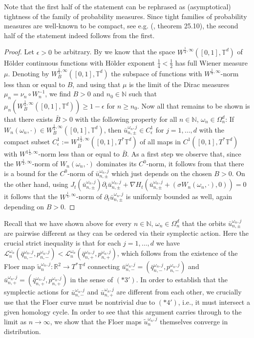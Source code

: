 \documentclass[a4paper,11pt]{amsart}
\newcommand{\NN}{\mathbb{N}}
\newcommand{\RR}{\mathbb{R}}
\newcommand{\TT}{\mathbb{T}}
\begin{document}
Note that the first half of the statement can be rephrased as (asymptotical) tightness of the family of probability measures. Since tight families of probability measures are well-known to be compact, see e.g. (\cite{Bi}, theorem 25.10), the second half of the statement indeed follows from the first.
\begin{proof}
Let $\epsilon>0$ be arbitrary. By  we know that the space $W^{\frac{1}{4},\infty}([0,1],\TT^d)$ of Hölder continuous functions with Hölder exponent $\frac{1}{4}<\frac{1}{2}$ has full Wiener measure $\mu$. Denoting by $W^{\frac{1}{4},\infty}_B([0,1],\TT^d)$ the subspace of functions with $W^{\frac{1}{4},\infty}$-norm less than or equal to $B$, and using that $\mu$ is the limit of the Dirac measures $\mu_n=\nu_n\circ W_n^{-1}$, we find $B>0$ and $n_0\in\NN$ such that $\mu_n(W^{\frac{1}{4},\infty}_B([0,1],\TT^d))\geq 1-\epsilon$ for $n\geq n_0$. Now all that remains to be shown is that there exists $\bar{B}>0$ with the following property for all $n\in\NN$, $\omega_n\in\Omega_n^d$: If $W_n(\omega_n,\cdot)\in W^{\frac{1}{4},\infty}_B([0,1],\TT^d)$, then $\bar{u}^{\omega_n,j}_{n,\pm}\in C^1_{\epsilon}$ for $j=1,\ldots,d$ with the compact subset $C^1_{\epsilon}:=W^{1\frac{1}{4},\infty}_{\bar{B}}([0,1],T^*\TT^d)$ of all maps in $C^1([0,1],T^*\TT^d)$ with $W^{1\frac{1}{4},\infty}$-norm less than or equal to $\bar{B}$. As a first step we observe that, since the $W^{\frac{1}{4},\infty}$-norm of $W_n(\omega_n,\cdot)$ dominates its $C^0$-norm, it follows from  that there is a bound for the $C^0$-norm of $\bar{u}^{\omega_n,j}_{n,\pm}$ which just depends on the chosen $B>0$. On the other hand, using $J_t(\bar{u}^{\omega_n,j}_{n,\pm})\partial_t\bar{u}^{\omega_n,j}_{n,\pm}+\nabla H_t(\bar{u}^{\omega_n,j}_{n,\pm}+(\sigma W_n(\omega_n,\cdot),0))=0$ it follows that the $W^{\frac{1}{4},\infty}$-norm of $\partial_t\bar{u}^{\omega_n,j}_{n,\pm}$ is uniformly bounded as well, again depending on $B>0$. 
\end{proof}
Recall that we have shown above for every $n\in\NN$, $\omega_n\in\Omega_n^d$ that the orbits $\bar{u}^{\omega_n,j}_{n,\pm}$ are pairwise different as they can be ordered via their symplectic action. Here the crucial strict inequality is that for each $j=1,\ldots,d$ we have $\mathcal{L}_n^{\omega_n}(\bar{q}^{\omega_n,j}_{n,-},p^{\omega_n,j}_{n,-})<\mathcal{L}_n^{\omega_n}(\bar{q}^{\omega_n,j}_{n,+},p^{\omega_n,j}_{n,+})$, which follows from the existence of the Floer map $\widetilde{u}^{\omega_n,j}_n:\RR^2\to T^*\TT^d$ connecting $\bar{u}^{\omega_n,j}_{n,-}=(\bar{q}^{\omega_n,j}_{n,-},p^{\omega_n,j}_{n,-})$ and $\bar{u}^{\omega_n,j}_{n,+}=(\bar{q}^{\omega_n,j}_{n,+},p^{\omega_n,j}_{n,+})$ in the sense of $(*3')$. In order to establish that the symplectic actions for $\bar{u}^{\omega_n,j}_{n,-}$ and $\bar{u}^{\omega_n,j}_{n,+}$ are different from each other, we crucially use that the Floer curve must be nontrivial due to $(*4')$, i.e., it must intersect a given homology cycle. In order to see that this argument carries through to the limit as $n\to\infty$, we show that the Floer maps $\widetilde{u}^{\omega_n,j}_n$ themselves converge in distribution.\\
\end{document}

